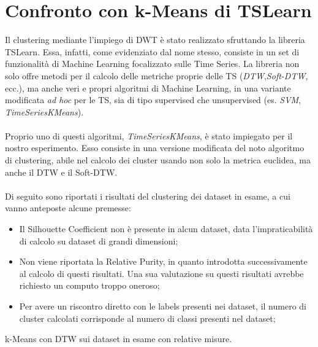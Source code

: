 \section{Confronto con k-Means di TSLearn}
Il clustering mediante l'impiego di DWT è stato realizzato sfruttando la libreria TSLearn.
Essa, infatti, come evidenziato dal nome stesso, consiste in un set di funzionalità di  Machine Learning focalizzato sulle Time Series.
La libreria non solo offre metodi per il calcolo delle metriche proprie delle TS (\textit{DTW},\textit{Soft-DTW}, ecc.), ma anche veri e propri algoritmi di Machine Learning, in una variante modificata \textit{ad hoc} per le TS, sia di tipo supervised che unsupervised (es. \textit{SVM}, \textit{TimeSeriesKMeans}).\\
\\
Proprio uno di questi algoritmi, \textit{TimeSeriesKMeans}, è stato impiegato per il nostro esperimento.
Esso consiste in una versione modificata del noto algoritmo di clustering, abile nel calcolo dei cluster usando non solo la metrica euclidea, ma anche il DTW e il Soft-DTW.\\
\\
Di seguito sono riportati i risultati del clustering dei dataset in esame, a cui vanno anteposte alcune premesse:
\begin{itemize}
	\item Il Silhouette Coefficient non è presente in alcun dataset, data l'impraticabilità di calcolo su dataset di grandi dimensioni;
	\item Non viene riportata la Relative Purity, in quanto introdotta successivamente al calcolo di questi risultati. Una sua valutazione su questi risultati avrebbe richiesto un computo troppo oneroso;
	\item Per avere un riscontro diretto con le labels presenti nei dataset, il numero di cluster calcolati corrisponde al numero di classi presenti nel dataset;
\end{itemize}

\begin{center}
	\begin{table}[H]
		\centering
		\caption{k-Means con DTW sui dataset in esame con relative misure.}
	\end{table}
\end{center}

